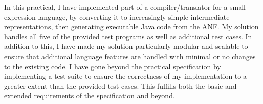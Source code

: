 \label{chapter:conclusion}


In this practical, I have implemented part of a compiler/translator for a small
expression language, by converting it to increasingly simple intermediate
representations, then generating executable Java code from the ANF. My solution
handles all five of the provided test programs as well as additional test
cases. In addition to this, I have made my solution particularly modular and
scalable to ensure that additional language features are handled with minimal
or no changes to the existing code. I have gone beyond the practical
specification by implementing a test suite to ensure the correctness of my
implementation to a greater extent than the provided test cases. This fulfills
both the basic and extended requirements of the specification and beyond.



